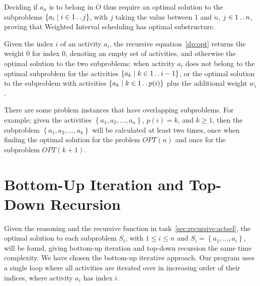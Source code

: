 \documentclass[a4paper,11pt]{article}
\newcommand{\twodots}{\mathinner{\ldotp\ldotp}}  %
\newcommand{\Set}[1]{\left\{#1\right\}}
\newcommand{\SetComp}[2]{\Set{#1\SuchThat#2}}
\newcommand{\SuchThat}{\mid}
\begin{document}
Deciding if $a_n$ is to belong in $O$ thus require an optimal solution to the
subproblems $\SetComp{a_i}{i \in 1\twodots j}$, with $j$ taking the value
between $1$ and $n$, $j \in 1 \twodots n$, proving that Weighted Interval
scheduling has optimal substructure.

Given the index $i$ of an activity $a_i$, the recursive equation~\ref{dp:opt}
returns the weight $0$ for index $0$, denoting an empty set of activities,
and otherwise the optimal solution to the two subproblems: when activity $a_i$ does
not belong to the optimal subproblem for the activities 
$\SetComp{a_k}{k \in 1 \twodots i-1}$, or the optimal solution to the
subproblem with activities $\SetComp{a_k}{k \in 1 \twodots p(i)}$ plus the additional
weight $w_i$.

There are some problem instances that have overlapping subproblems. For
example; given the activities $\Set{a_1, a_2, \dots, a_n}$, $p(i)=k$, and $k\geq 1$,
then the subproblem $\Set{a_1, a_2, \dots, a_k}$ will be calculated at least
two times, once when finding the optimal solution for the problem $OPT(n)$ and
once for the subproblem $OPT(k+1)$.

\section{Bottom-Up Iteration and Top-Down Recursion}
\label{sec:bottom-up-rec}

Given the reasoning and the recursive function in task~\ref{sec:recursive:actsel},
the optimal solution to each subproblem $S_i$, with $1 \leq i \leq n$
and $S_i=\Set{a_1, \dots, a_i}$, will be found, giving
bottom-up iteration and top-down recursion the same time complexity.
We have chosen the bottom-up iterative approach. Our program
uses a single loop where all activities are iterated over in
increasing order of their indices, where activity $a_i$ has index $i$.





\end{document}
